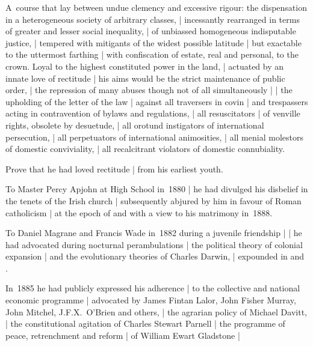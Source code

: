 \Factual[~(legal)]
A~course that lay between undue clemency and excessive rigour:
the dispensation in a heterogeneous society of arbitrary classes, |
incessantly rearranged in terms of greater and lesser social inequality, |
of unbiassed homogeneous indisputable justice, |
tempered with mitigants of the widest possible latitude |
but exactable to the uttermost farthing |
with confiscation of estate, real and personal, to the crown.
Loyal to the highest constituted power in the land, |
actuated by an innate love of rectitude |
his aims would be the strict maintenance of public order, |
the repression of many abuses though not of all simultaneously |
 |
the upholding of the letter of the law
 |
against all traversers in covin |
and trespassers acting in contravention of bylaws and regulations, |
all resuscitators
 |
of venville rights, obsolete by desuetude, |
all orotund instigators of international persecution, |
all perpetuators of international animosities, |
all menial molestors of domestic conviviality, |
all recalcitrant violators of domestic connubiality.


Prove that he had loved rectitude |
from his earliest youth.

\Religious
To Master Percy Apjohn at High School in~1880 |
he had divulged his disbelief in the tenets of the Irish
church |
subsequently abjured by him in favour of Roman catholicism |
at the epoch of and with a view to his matrimony in~1888.

\Science
To Daniel Magrane and Francis Wade in~1882 during a juvenile friendship |
 |
he had advocated during nocturnal perambulations |
the political theory of colonial
expansion |
and the evolutionary theories of Charles Darwin, |
expounded in  and .

\Factual
In~1885 he had publicly expressed his adherence |
to the collective and national economic programme |
advocated by James Fintan Lalor, John Fisher Murray, John Mitchel,
J.F.X.~O'Brien and others, |
the agrarian policy of Michael Davitt, |
the constitutional agitation of Charles Stewart Parnell
 |
the programme of peace, retrenchment and reform |
of William Ewart Gladstone
 |


